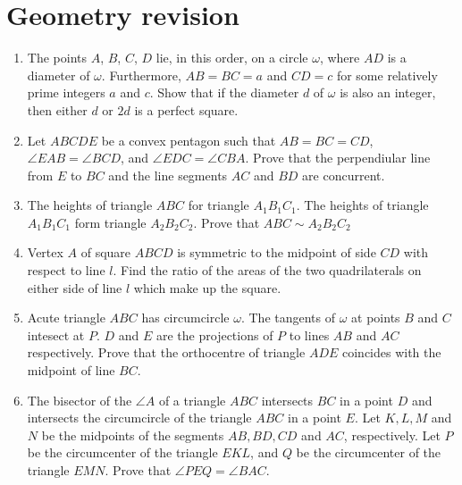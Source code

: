 \documentclass{article}
\begin{document}
\section{Geometry revision}
\begin{enumerate}
  \item %
  The points $A$, $B$, $C$, $D$ lie, in this order, on a circle $\omega$, where $AD$ is a diameter of $\omega$. Furthermore, $AB = BC = a$ and $CD = c$ for some relatively prime integers $a$ and $c$. Show that if the diameter $d$ of $\omega$ is also an integer, then either $d$ or $2d$ is a perfect square.

  \item %
  Let $ABCDE$ be a convex pentagon such that $AB = BC = CD$, $\angle EAB =  \angle BCD$, and $\angle EDC = \angle CBA$. Prove that the perpendiular line from $E$ to $BC$ and the line segments $AC$ and $BD$ are concurrent.

  \item %
  The heights of triangle $ABC$ for triangle $A_1B_1C_1$. The heights of triangle $A_1B_1C_1$ form triangle $A_2B_2C_2$. Prove that $ABC \sim A_2B_2C_2$

  \item %
  Vertex $A$ of square $ABCD$ is symmetric to the midpoint of side $CD$ with respect to line $l$. Find the ratio of the areas of the two quadrilaterals on either side of line $l$ which make up the square.

  \item %
  Acute triangle $ABC$ has circumcircle $\omega$. The tangents of $\omega$ at points $B$ and $C$ intesect at $P$. $D$ and $E$ are the projections of $P$ to lines $AB$ and $AC$ respectively. Prove that the orthocentre of triangle $ADE$ coincides with the midpoint of line $BC$.

  \item %
  The bisector of the $\angle A$ of a triangle $ABC$ intersects $BC$ in a point $D$ and intersects the circumcircle of the triangle $ABC$ in a point $E$. Let $K, L, M$ and $N$ be the midpoints of the segments $AB, BD, CD$ and $AC$, respectively. Let $P$ be the circumcenter of the triangle $EKL$, and $Q$ be the circumcenter of the triangle $EMN$. Prove that $\angle PEQ = \angle BAC$.

\end{enumerate}
\end{document}
